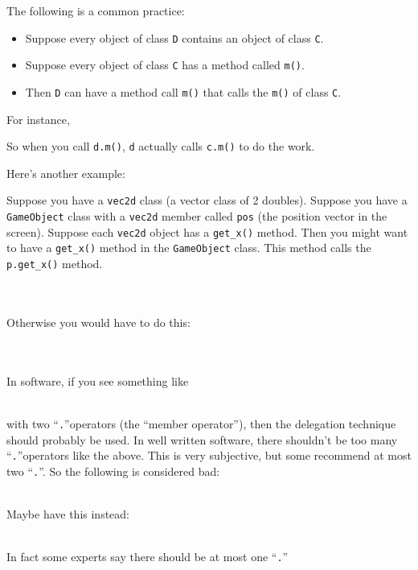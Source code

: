The following is a common practice:

\begin{itemize}
\item
  Suppose every object of class \texttt{D} contains an object of class
  \texttt{C}.
\item
  Suppose every object of class \texttt{C} has a method called \texttt{m()}.
\item
  Then \texttt{D} can have a method call \texttt{m()} that calls the
  \texttt{m()} of class \texttt{C}.
\end{itemize}

For instance,


So when you call \texttt{d.m()}, \texttt{d} actually calls \texttt{c.m()} to
do the work.

Here's another example:

Suppose you have a \texttt{vec2d} class (a vector class of 2 doubles).
Suppose you have a \texttt{GameObject} class with a \texttt{vec2d} member called \texttt{pos} (the position vector in the screen). Suppose each \texttt{vec2d} object has a \verb!get_x()! method. Then you might want to have a \verb!get_x()! method in the \texttt{GameObject} class. This method calls the \verb!p.get_x()! method.

\\
\\

Otherwise you would have to do this:

\\
\\

In software, if you see something like

\\

with two ``\texttt{.}''operators (the ``member operator''), then the
delegation technique should probably be used. In well written software,
there shouldn't be too many ``\texttt{.}''operators like
the above. This is very subjective, but some recommend at most two
``\texttt{.}''. So the following is considered bad:

\\

Maybe have this instead:

\\

In fact some experts say there should be at most one ``\texttt{.}''

